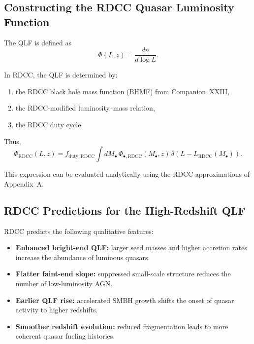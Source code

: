 \documentclass[11pt,a4paper]{article}
\begin{document}
\subsection{Constructing the RDCC Quasar Luminosity Function}

The QLF is defined as
\begin{equation}
\Phi(L,z)
=
\frac{dn}{d\log L}.
\end{equation}

In RDCC, the QLF is determined by:
\begin{enumerate}
\item the RDCC black hole mass function (BHMF) from Companion~XXIII,
\item the RDCC-modified luminosity–mass relation,
\item the RDCC duty cycle.
\end{enumerate}

Thus,
\begin{equation}
\Phi_{\mathrm{RDCC}}(L,z)
=
f_{\mathrm{duty,RDCC}}
\int dM_{\bullet}\,
\Phi_{\bullet,\mathrm{RDCC}}(M_{\bullet},z)\,
\delta\!\left(L - L_{\mathrm{RDCC}}(M_{\bullet})\right).
\end{equation}

This expression can be evaluated analytically using the RDCC approximations of Appendix~A.

\subsection{RDCC Predictions for the High-Redshift QLF}

RDCC predicts the following qualitative features:
\begin{itemize}
\item \textbf{Enhanced bright-end QLF:} larger seed masses and higher accretion rates increase the abundance of luminous quasars.
\item \textbf{Flatter faint-end slope:} suppressed small-scale structure reduces the number of low-luminosity AGN.
\item \textbf{Earlier QLF rise:} accelerated SMBH growth shifts the onset of quasar activity to higher redshifts.
\item \textbf{Smoother redshift evolution:} reduced fragmentation leads to more coherent quasar fueling histories.
\end{itemize}
\end{document}

